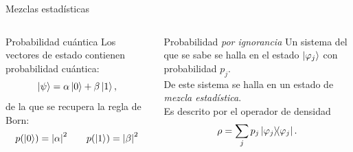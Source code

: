 \begin{frame}{Mezclas estadísticas}
    \begin{columns}
        \begin{column}{0.5\textwidth}
            \begin{block}{Probabilidad cuántica}
            Los vectores de estado contienen probabilidad cuántica:
            \begin{equation}
                \ket{\psi}=\alpha\ket{0}+\beta\ket{1},\nonumber
            \end{equation}
            \pause
            de la que se recupera la regla de Born:
            \begin{equation}
                p(\ket{0})=\abs{\alpha}^{2}\qquad p(\ket{1})=\abs{\beta}^{2}\nonumber
            \end{equation}
        \end{block}
        \end{column}
        \pause
        \begin{column}{0.5\textwidth}
            \begin{block}{Probabilidad \textit{por ignorancia}}
            Un sistema del que se sabe se halla en el estado $\ket{\varphi_{j}}$ con probabilidad $p_{j}$.\\
            \vspace{0.2cm}
            \pause
            De este sistema se halla en un estado de \textit{mezcla estadística}.\\
            \vspace{0.2cm}
            \pause
            Es descrito por el operador de densidad
            \begin{equation}
                \rho=\sum_{j}p_{j}\dyad{\varphi_{j}}.\nonumber
            \end{equation}
        \end{block}
        \end{column}
    \end{columns}
\end{frame}
